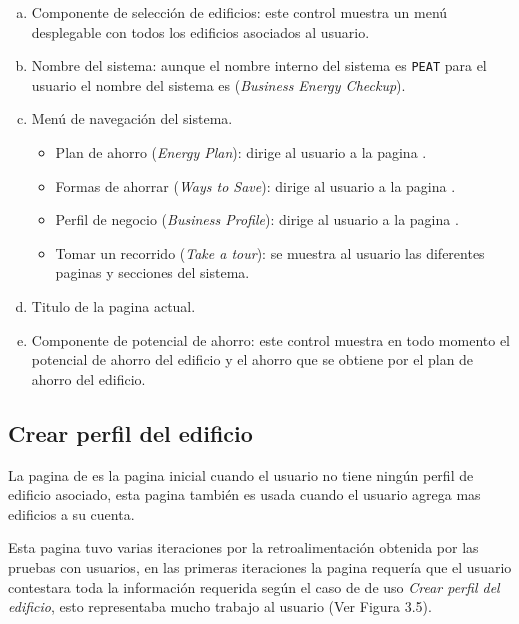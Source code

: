 \begin{enumerate}[a)]
\item Componente de selección de edificios: este control muestra un menú
  desplegable con todos los edificios asociados al usuario.
\item Nombre del sistema: aunque el nombre interno del sistema es \texttt{PEAT}
  para el usuario el nombre del sistema es 
  (\textit{Business Energy Checkup}).
\item Menú de navegación del sistema.
  \begin{itemize}
  \item Plan de ahorro (\textit{Energy Plan}): dirige al usuario a la pagina
    .
  \item Formas de ahorrar (\textit{Ways to Save}): dirige al usuario a la pagina
    .
  \item Perfil de negocio (\textit{Business Profile}): dirige al usuario a la pagina
    .
  \item Tomar un recorrido (\textit{Take a tour}): se muestra al usuario
    las diferentes paginas y secciones del sistema.
  \end{itemize}
\item Titulo de la pagina actual.
\item Componente de potencial de ahorro: este control muestra en todo momento
  el potencial de ahorro del edificio y el ahorro que se obtiene por el plan
  de ahorro del edificio.
\end{enumerate}



\subsection{Crear perfil del edificio}

La pagina de  es la pagina inicial
cuando el usuario no tiene ningún perfil de edificio asociado, esta pagina
también es usada cuando el usuario agrega mas edificios a su cuenta.

Esta pagina tuvo varias iteraciones por la retroalimentación obtenida por las
pruebas con usuarios, en las primeras iteraciones la pagina requería que el
usuario contestara toda la información requerida según el caso de de uso
\textit{Crear perfil del edificio}, esto representaba mucho trabajo al usuario
(Ver Figura 3.5).

